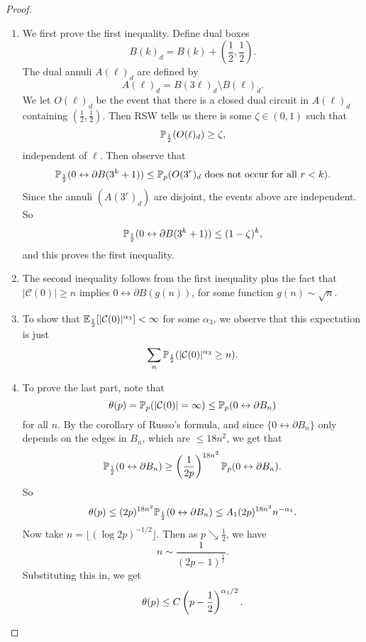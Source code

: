 \documentclass[a4paper]{article}
\begin{document}
\begin{proof}\leavevmode
  \begin{enumerate}
    \item We first prove the first inequality. Define dual boxes
      \[
        B(k)_d = B(k) + \left(\frac{1}{2}, \frac{1}{2}\right).
      \]
      The dual annuli $A(\ell)_d$ are defined by
      \[
        A(\ell)_d = B(3\ell)_d \setminus B(\ell)_d.
      \]
      We let $O(\ell)_d$ be the event that there is a closed dual circuit in $A(\ell)_d$ containing $\left(\frac{1}{2}, \frac{1}{2}\right)$. Then RSW tells us there is some $\zeta \in (0, 1)$ such that
      \[
        \P_{\frac{1}{2}}(O(\ell)_d) \geq \zeta,
      \]
      independent of $\ell$. Then observe that
      \[
        \P_{\frac{1}{2}} (0 \leftrightarrow \partial B(3^k + 1)) \leq \P_p(O(3^r)_d\text{ does not occur for all }r < k).
      \]
      Since the annuli $(A(3^r)_d)$ are disjoint, the events above are independent. So
      \[
        \P_{\frac{1}{2}}(0 \leftrightarrow \partial B(3^k + 1)) \leq (1 - \zeta)^k,
      \]
      and this proves the first inequality.

    \item The second inequality follows from the first inequality plus the fact that $|\mathcal{C}(0)| \geq n$ implies $0 \leftrightarrow \partial B(g(n))$, for some function $g(n) \sim \sqrt{n}$.

    \item To show that $\E_{\frac{1}{2}}[|\mathcal{C}(0)|^{\alpha_3}] < \infty$ for some $\alpha_3$, we observe that this expectation is just
      \[
        \sum_n \P_{\frac{1}{2}}(|\mathcal{C}(0)|^{\alpha_3} \geq n).
      \]
    \item To prove the last part, note that
      \[
        \theta(p) = \P_p(|\mathcal{C}(0)| = \infty) \leq \P_p(0 \leftrightarrow \partial B_n)
      \]
      for all $n$. By the corollary of Russo's formula, and since $\{0 \leftrightarrow \partial B_n\}$ only depends on the edges in $B_n$, which are $\leq 18 n^2$, we get that
      \[
        \P_{\frac{1}{2}}(0 \leftrightarrow \partial B_n) \geq \left(\frac{1}{2p}\right)^{18n^2}\P_p(0 \leftrightarrow \partial B_n).
      \]
      So
      \[
        \theta(p) \leq (2p)^{18n^2} \P_{\frac{1}{2}}(0 \leftrightarrow \partial B_n) \leq A_1 (2p)^{18n^2} n^{-\alpha_1}.
      \]
      Now take $n = \lfloor (\log 2p)^{-1/2} \rfloor $. Then as $p \searrow \frac{1}{2}$, we have
      \[
        n \sim \frac{1}{(2p - 1)^{\frac{1}{2}}}.
      \]
      Substituting this in, we get
      \[
        \theta(p) \leq C \left(p - \frac{1}{2}\right)^{\alpha_1/2}.\qedhere
      \]%
  \end{enumerate}
\end{proof}
\end{document}
